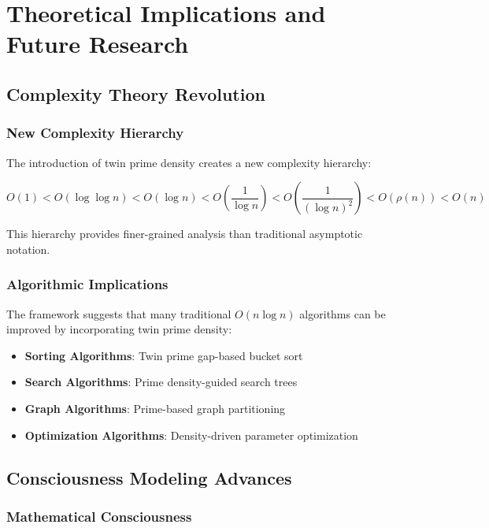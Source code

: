 \documentclass[12pt,a4paper]{article}
\begin{document}
\section{Theoretical Implications and Future Research}

\subsection{Complexity Theory Revolution}

\subsubsection{New Complexity Hierarchy}

The introduction of twin prime density creates a new complexity hierarchy:

\[
O(1) < O(\log \log n) < O(\log n) < O\left(\frac{1}{\log n}\right) < O\left(\frac{1}{(\log n)^2}\right) < O(\rho(n)) < O(n)
\]

This hierarchy provides finer-grained analysis than traditional asymptotic notation.

\subsubsection{Algorithmic Implications}

The framework suggests that many traditional $O(n \log n)$ algorithms can be improved by incorporating twin prime density:

\begin{itemize}
    \item \textbf{Sorting Algorithms}: Twin prime gap-based bucket sort
    \item \textbf{Search Algorithms}: Prime density-guided search trees
    \item \textbf{Graph Algorithms}: Prime-based graph partitioning
    \item \textbf{Optimization Algorithms}: Density-driven parameter optimization
\end{itemize}

\subsection{Consciousness Modeling Advances}

\subsubsection{Mathematical Consciousness}
\end{document}
